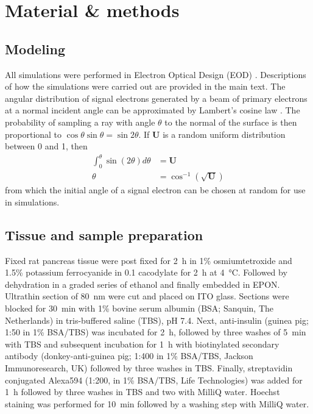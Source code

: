 \section{Material \& methods}
\label{sec:2.4_methods}


\subsection{Modeling}
\label{sec:2.4.1_modeling}

All simulations were performed in Electron Optical Design (EOD) \cite{lencova2008new}. Descriptions of how the simulations were carried out are provided in the main text. The angular distribution of signal electrons generated by a beam of primary electrons at a normal incident angle can be approximated by Lambert's cosine law \cite{reimer1998emission}. The probability of sampling a ray with angle $\theta$ to the normal of the surface is then proportional to $\cos\theta \sin\theta = \sin 2\theta$. If $\boldsymbol{U}$ is a random uniform distribution between 0 and 1, then
%
\begin{align}
    \int_0^\theta \sin \left( 2\theta \right) d\theta &= \boldsymbol{U} \\
    \theta &= \cos^{-1} \left( \sqrt{\boldsymbol{U}} \right)
\end{align}
%
from which the initial angle of a signal electron can be chosen at random for use in simulations.


\subsection{Tissue and sample preparation}
\label{sec:2.4.2_sampleprep}

Fixed rat pancreas tissue were post fixed for \SI{2}{\hour} in 1\% osmiumtetroxide and 1.5\% potassium ferrocyanide in \SI{0.1}{\molar} cacodylate for \SI{2}{\hour} at \SI{4}{\celsius}. Followed by dehydration in a graded series of ethanol and finally embedded in EPON. Ultrathin section of \SI{80}{\nano\meter} were cut and placed on ITO glass. Sections were blocked for \SI{30}{\minute} with 1\% bovine serum albumin (BSA; Sanquin, The Netherlands) in tris-buffered saline (TBS), pH 7.4. Next, anti-insulin (guinea pig; 1:50 in 1\% BSA/TBS) was incubated for \SI{2}{\hour}, followed by three washes of \SI{5}{\minute} with TBS and subsequent incubation for \SI{1}{\hour} with biotinylated secondary antibody (donkey-anti-guinea pig; 1:400 in 1\% BSA/TBS, Jackson Immunoresearch, UK) followed by three washes in TBS. Finally, streptavidin conjugated Alexa594 (1:200, in 1\% BSA/TBS, Life Technologies) was added for \SI{1}{\hour} followed by three washes in TBS and two with MilliQ water. Hoechst staining was performed for \SI{10}{\minute} followed by a washing step with MilliQ water.

